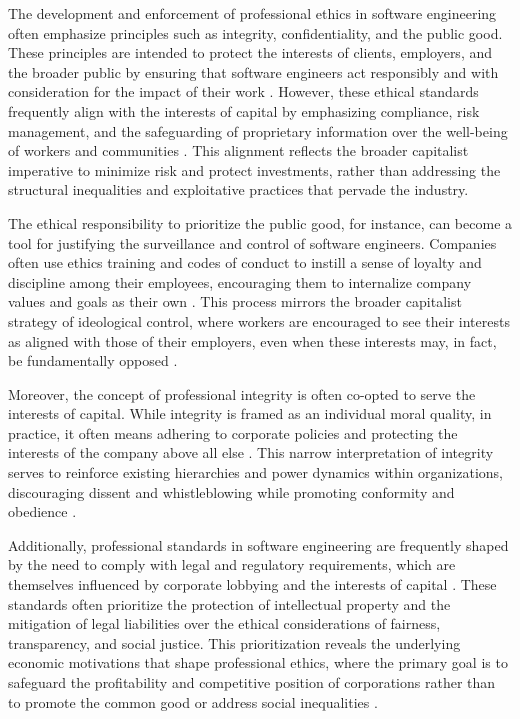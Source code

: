 \begin{refsection}
The development and enforcement of professional ethics in software engineering often emphasize principles such as integrity, confidentiality, and the public good. These principles are intended to protect the interests of clients, employers, and the broader public by ensuring that software engineers act responsibly and with consideration for the impact of their work \cite[pp.~56-58]{engels1987condition}. However, these ethical standards frequently align with the interests of capital by emphasizing compliance, risk management, and the safeguarding of proprietary information over the well-being of workers and communities \cite[pp.~96-99]{marx2008capital}. This alignment reflects the broader capitalist imperative to minimize risk and protect investments, rather than addressing the structural inequalities and exploitative practices that pervade the industry.

The ethical responsibility to prioritize the public good, for instance, can become a tool for justifying the surveillance and control of software engineers. Companies often use ethics training and codes of conduct to instill a sense of loyalty and discipline among their employees, encouraging them to internalize company values and goals as their own \cite[pp.~118-120]{braverman1974labor}. This process mirrors the broader capitalist strategy of ideological control, where workers are encouraged to see their interests as aligned with those of their employers, even when these interests may, in fact, be fundamentally opposed \cite[pp.~482-485]{marx2008capital}.

Moreover, the concept of professional integrity is often co-opted to serve the interests of capital. While integrity is framed as an individual moral quality, in practice, it often means adhering to corporate policies and protecting the interests of the company above all else \cite[pp.~74-76]{marx2008capital}. This narrow interpretation of integrity serves to reinforce existing hierarchies and power dynamics within organizations, discouraging dissent and whistleblowing while promoting conformity and obedience \cite[pp.~154-157]{engels1987condition}. 

Additionally, professional standards in software engineering are frequently shaped by the need to comply with legal and regulatory requirements, which are themselves influenced by corporate lobbying and the interests of capital \cite[pp.~35-39]{braverman1974labor}. These standards often prioritize the protection of intellectual property and the mitigation of legal liabilities over the ethical considerations of fairness, transparency, and social justice. This prioritization reveals the underlying economic motivations that shape professional ethics, where the primary goal is to safeguard the profitability and competitive position of corporations rather than to promote the common good or address social inequalities \cite[pp.~284-287]{marx2008capital}.


\end{refsection}

